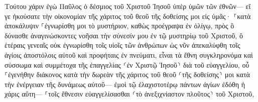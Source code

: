 \documentclass{openreader}
\begin{document}
Τούτου χάριν ἐγὼ Παῦλος ὁ δέσμιος τοῦ Χριστοῦ Ἰησοῦ ὑπὲρ ὑμῶν τῶν ἐθνῶν— 
εἴ γε ἠκούσατε τὴν οἰκονομίαν τῆς χάριτος τοῦ θεοῦ τῆς δοθείσης μοι εἰς ὑμᾶς· 
⸀κατὰ ἀποκάλυψιν ⸀ἐγνωρίσθη μοι τὸ μυστήριον, καθὼς προέγραψα ἐν ὀλίγῳ, 
πρὸς ὃ δύνασθε ἀναγινώσκοντες νοῆσαι τὴν σύνεσίν μου ἐν τῷ μυστηρίῳ τοῦ Χριστοῦ, 
ὃ ἑτέραις γενεαῖς οὐκ ἐγνωρίσθη τοῖς υἱοῖς τῶν ἀνθρώπων ὡς νῦν ἀπεκαλύφθη τοῖς ἁγίοις ἀποστόλοις αὐτοῦ καὶ προφήταις ἐν πνεύματι, 
εἶναι τὰ ἔθνη συγκληρονόμα καὶ σύσσωμα καὶ συμμέτοχα τῆς ἐπαγγελίας ⸂ἐν Χριστῷ Ἰησοῦ⸃ διὰ τοῦ εὐαγγελίου, 
οὗ ⸀ἐγενήθην διάκονος κατὰ τὴν δωρεὰν τῆς χάριτος τοῦ θεοῦ ⸂τῆς δοθείσης⸃ μοι κατὰ τὴν ἐνέργειαν τῆς δυνάμεως αὐτοῦ— 
ἐμοὶ τῷ ἐλαχιστοτέρῳ πάντων ἁγίων ἐδόθη ἡ χάρις αὕτη— ⸀τοῖς ἔθνεσιν εὐαγγελίσασθαι ⸂τὸ ἀνεξιχνίαστον πλοῦτος⸃ τοῦ Χριστοῦ, 
\end{document}
